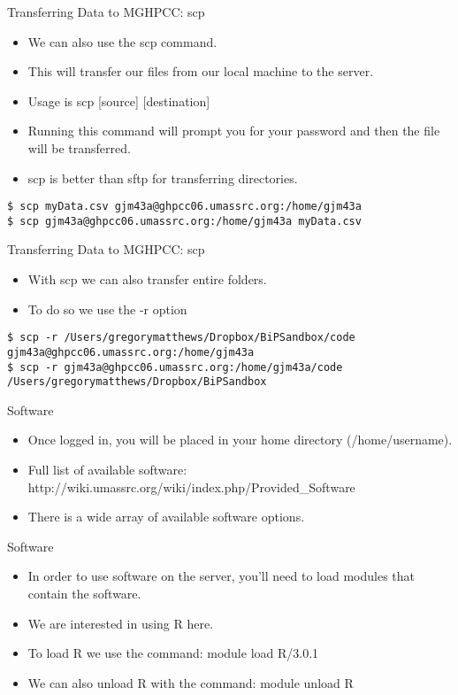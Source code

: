 \documentclass[table]{beamer}\usepackage[]{graphicx}\usepackage[]{color}
\begin{document}
\begin{frame}{Transferring Data to MGHPCC: scp}
\begin{itemize}
\item We can also use the scp command.
\item This will transfer our files from our local machine to the server. 
\item Usage is scp [source] [destination]
\item Running this command will prompt you for your password and then the file will be transferred.  
\item scp is better than sftp for transferring directories.  
\end{itemize}
{\tt \$ scp myData.csv gjm43a@ghpcc06.umassrc.org:/home/gjm43a}\\
{\tt \$ scp gjm43a@ghpcc06.umassrc.org:/home/gjm43a myData.csv}
\end{frame}

\begin{frame}{Transferring Data to MGHPCC: scp}
\begin{itemize}
\item With scp we can also transfer entire folders.
\item To do so we use the -r option
\end{itemize}
{\tt \$ scp -r /Users/gregorymatthews/Dropbox/BiPSandbox/code gjm43a@ghpcc06.umassrc.org:/home/gjm43a}\\
{\tt \$ scp -r gjm43a@ghpcc06.umassrc.org:/home/gjm43a/code /Users/gregorymatthews/Dropbox/BiPSandbox}
\end{frame}



\begin{frame}{Software}
\begin{itemize}
\item Once logged in, you will be placed in your home directory (/home/username). 
\item Full list of available software: http://wiki.umassrc.org/wiki/index.php/Provided\_Software  
\item There is a wide array of available software options. 
\end{itemize}
\end{frame}

\begin{frame}{Software}
\begin{itemize}
\item In order to use software on the server, you'll need to load modules that contain the software.  
\item We are interested in using R here.  
\item To load R we use the command: module load R/3.0.1
\item We can also unload R with the command:  module unload R
\end{itemize}
\end{frame}
\end{document}
